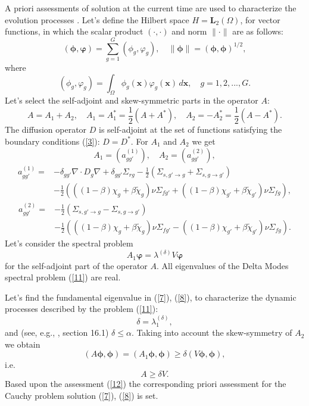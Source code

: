 \documentclass[authoryear]{elsarticle}
\begin{document}
A priori assessments of solution at the current time are used to characterize the evolution processes \cite{bookEvans}. Let’s define the Hilbert space $H = \bm L_2(\Omega)$, for vector functions, in which the scalar product $(\cdot, \cdot)$  and norm $\|\cdot \|$ are as follows:
\[
 (\bm \phi , \bm \varphi) = \sum_{g=1}^{G} (\phi_g, \varphi_g) ,
 \quad \|\bm \phi \| = (\bm \phi , \bm \phi)^{1/2} ,
\] 
where
\[
 (\phi_g, \varphi_g) = \int_{\Omega} \phi_g (\bm x) \varphi_g (\bm x) \, d \bm x ,
 \quad g = 1,2, ..., G . 
\] 
Let’s select the self-adjoint and skew-symmetric parts in the operator $A$:
\[
 A = A_1 + A_2, 
 \quad A_1 = A_1^* = \frac{1}{2} (A + A^*), 
 \quad A_2 = - A_2^* = \frac{1}{2} (A - A^*) .
\]
The diffusion operator $D$ is self-adjoint at the set of functions satisfying the boundary conditions (\ref{3}): $D = D^*$. For $A_1$ and $A_2$ we get
\[
 A_1 = (a^{(1)}_{g g'}), 
 \quad A_2 = (a^{(2)}_{g g'}),
\]
\[
\begin{split}
 a^{(1)}_{g g'} = & - \delta_{g g'} \nabla \cdot D_g \nabla
 +  \delta_{g g'} \Sigma_{rg} 
 -  \frac{1}{2} \left ( \Sigma_{s,g'\rightarrow g} + \Sigma_{s,g\rightarrow g'} \right ) \\
 & - \frac{1}{2} \left ( ( (1-\beta) \chi_g + \beta \widetilde{\chi}_g) \nu \Sigma_{fg'} 
 + ( (1-\beta) \chi_{g'} + \beta \widetilde{\chi}_{g'}) \nu \Sigma_{fg} \right ) ,
\end{split}
\] 
\[
\begin{split}
  a^{(2)}_{g g'} = & - 
 \frac{1}{2} \left ( \Sigma_{s,g'\rightarrow g} - \Sigma_{s,g\rightarrow g'} \right ) \\
 & - \frac{1}{2} \left ( ( (1-\beta) \chi_g + \beta \widetilde{\chi}_g) \nu \Sigma_{fg'} 
 - ( (1-\beta) \chi_{g'} + \beta \widetilde{\chi}_{g'}) \nu \Sigma_{fg} \right ) .
\end{split}
\] 
Let’s consider the spectral problem
\begin{equation}\label{11}
 A_1 \bm \varphi  =  \lambda^{(\delta)} V \bm \varphi 
\end{equation} 
for the self-adjoint part of the operator $A$. All eigenvalues of the Delta Modes spectral problem (\ref{11}) are real.

Let’s find the fundamental eigenvalue in (\ref{7}), (\ref{8}), to characterize the dynamic processes described by the problem (\ref{11}):
\[
  \delta  = \lambda^{(\delta )}_1,
\] 
and (see, e.g., \cite{Hogben}, section 16.1) $\delta  \leq \alpha$.
Taking into account the skew-symmetry of $A_2$  we obtain
\[
 (A \bm \phi, \bm \phi) = (A_1 \bm \phi, \bm \phi) \geq \delta  (V \bm \phi,\bm \phi),
\] 
i.e.
\begin{equation}\label{12}
 A \geq \delta V . 
\end{equation} 
Based upon the assessment (\ref{12}) the corresponding priori assessment for the Cauchy problem solution (\ref{7}), (\ref{8}) is set. 
\end{document}

